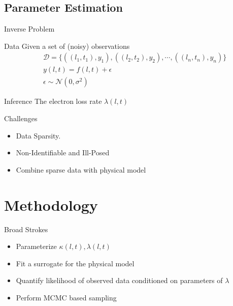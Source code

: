 \documentclass{beamer}
\begin{document}
\subsection{Parameter Estimation}

\begin{frame}{Inverse Problem}
  \begin{block}{Data}
    Given a set of (noisy) observations
    \begin{align*}
      & \mathcal{D} = \{ ((l_1, t_1), y_1), ((l_2, t_2), y_2),
                    \cdots, ((l_n, t_n), y_n) \} \\
      & y(l, t) = f(l, t) + \epsilon \\
      & \epsilon \sim \mathcal{N}(0, \sigma^2)
    \end{align*}
  \end{block}
  
  \begin{block}{Inference}
    The electron loss rate $\lambda(l, t)$
  \end{block}
\end{frame}

\begin{frame}{Challenges}
  \begin{itemize}
  \item<1->{
      Data Sparsity.
    }
  \item<2->{Non-Identifiable and Ill-Posed}
  \item<3->{Combine sparse data with physical model}
  \end{itemize}
\end{frame}


\section{Methodology}

\begin{frame}{Broad Strokes}
  \begin{itemize}
  \item<1->{
      Parameterize $\kappa(l, t), \lambda(l, t)$
    }
  \item<2->{Fit a surrogate for the physical model}
  \item<3->{Quantify likelihood of observed data conditioned on
      parameters of $\lambda$}
  \item<4->{Perform MCMC based sampling}
  \end{itemize}
\end{frame}
\end{document}

